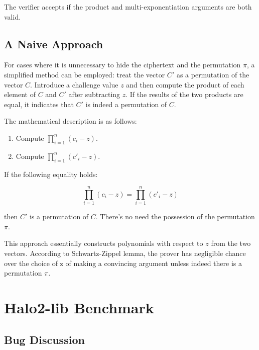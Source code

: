 \documentclass{article}
\begin{document}
The verifier accepts if the product and multi-exponentiation arguments are both valid.

\subsection{A Naive Approach}

For cases where it is unnecessary to hide the ciphertext and the permutation \(\pi\), a simplified method can be employed: treat the vector \( C' \) as a permutation of the vector \( C \). Introduce a challenge value \( z \) and then compute the product of each element of \( C \) and \( C' \) after subtracting \( z \). If the results of the two products are equal, it indicates that \( C' \) is indeed a permutation of \( C \).

The mathematical description is as follows:

\begin{enumerate}
    \item Compute \( \prod_{i=1}^{n} (c_i - z) \).
    \item Compute \( \prod_{i=1}^{n} (c'_i - z) \).
\end{enumerate}

If the following equality holds:

\[
\prod_{i=1}^{n} (c_i - z) = \prod_{i=1}^{n} (c'_i - z)
\]

then \( C' \) is a permutation of \( C \). There's no need the possession of the permutation $\pi$.

This approach essentially constructs polynomials with respect to \( z \) from the two vectors. According to Schwartz-Zippel lemma, the prover has negligible chance over the choice of z of making a convincing argument unless indeed there is a permutation $\pi$.






\section{Halo2-lib Benchmark}


\subsection{Bug Discussion}
\end{document}
